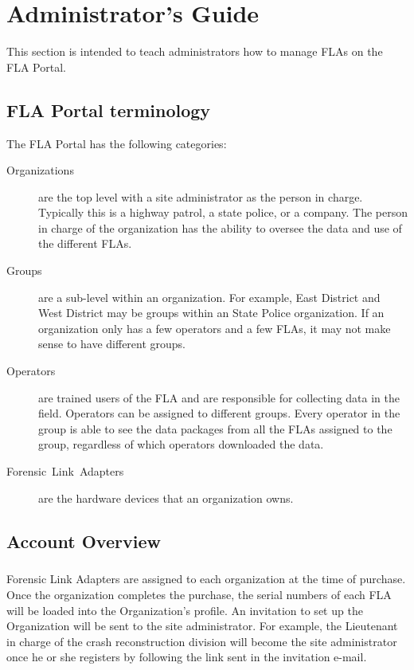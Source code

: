 \documentclass[11pt, oneside]{book}
\begin{document}
\chapter{Administrator's Guide}\label{chap:admin_guide}

This section is intended to teach administrators how to manage FLAs
on the FLA Portal.


\section{FLA Portal terminology}

The FLA Portal has the following categories:
\begin{description}
\item [{Organizations}] are the top level with a site administrator as
the person in charge. Typically this is a highway patrol, a state
police, or a company. The person in charge of the organization has
the ability to oversee the data and use of the different FLAs.
\item [{Groups}] are a sub-level within an organization. For example, East
District and West District may be groups within an State Police organization.
If an organization only has a few operators and a few FLAs, it may
not make sense to have different groups. 
\item [{Operators}] are trained users of the FLA and are responsible for
collecting data in the field. Operators can be assigned to different
groups. Every operator in the group is able to see the data packages
from all the FLAs assigned to the group, regardless of which operators
downloaded the data.
\item [{Forensic~Link~Adapters}] are the hardware devices that an organization
owns.
\end{description}

\section{Account Overview}
\paragraph{  }
Forensic Link Adapters are assigned to each organization at the time
of purchase. Once the organization completes the purchase, the serial
numbers of each FLA will be loaded into the Organization's profile.
An invitation to set up the Organization will be sent to the site
administrator. For example, the Lieutenant in charge of the crash
reconstruction division will become the site administrator once he
or she registers by following the link sent in the invitation e-mail.
\end{document}
